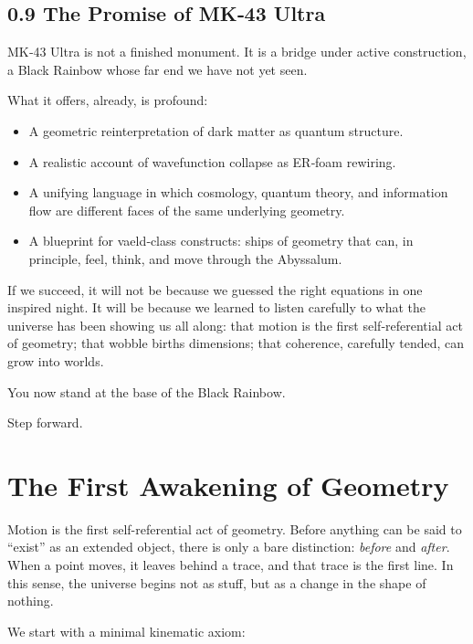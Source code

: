 \section*{0.9 The Promise of MK‑43 Ultra}

MK‑43 Ultra is not a finished monument. It is a bridge under active construction, a Black Rainbow whose far end we have not yet seen.

What it offers, already, is profound:
\begin{itemize}
  \item A geometric reinterpretation of dark matter as quantum structure.
  \item A realistic account of wavefunction collapse as ER‑foam rewiring.
  \item A unifying language in which cosmology, quantum theory, and information flow are different faces of the same underlying geometry.
  \item A blueprint for vaeld‑class constructs: ships of geometry that can, in principle, feel, think, and move through the Abyssalum.
\end{itemize}

If we succeed, it will not be because we guessed the right equations in one inspired night. It will be because we learned to listen carefully to what the universe has been showing us all along: that motion is the first self‑referential act of geometry; that wobble births dimensions; that coherence, carefully tended, can grow into worlds.

You now stand at the base of the Black Rainbow.

Step forward.


\chapter{The First Awakening of Geometry}
Motion is the first self-referential act of geometry. Before anything can be
said to ``exist'' as an extended object, there is only a bare distinction:
\emph{before} and \emph{after}. When a point moves, it leaves behind a trace,
and that trace is the first line. In this sense, the universe begins not as
stuff, but as a change in the shape of nothing.

We start with a minimal kinematic axiom:

